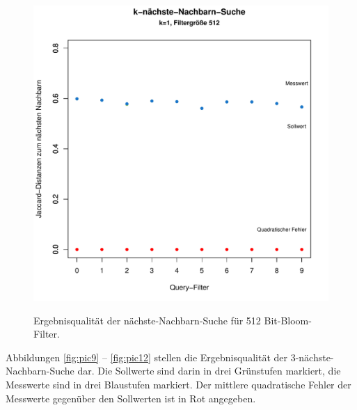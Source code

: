 \begin{figure}[hpbt]
 	\includegraphics[scale=0.7]{pictures/nn_512.pdf}\\
  	\caption[Ergebnisqualität der nächste-Nachbarn-Suche für 256 Bit-Bloom-Filter]{Ergebnisqualität der nächste-Nachbarn-Suche für 512 Bit-Bloom-Filter.}\label{fig:pic8}
\end{figure}
Abbildungen \ref{fig:pic9} -- \ref{fig:pic12} stellen die Ergebnisqualität der 3-nächste-Nachbarn-Suche dar. Die Sollwerte sind darin in drei Grünstufen markiert, die Messwerte sind in drei Blaustufen markiert. Der mittlere quadratische Fehler der Messwerte gegenüber den Sollwerten ist in Rot angegeben.
